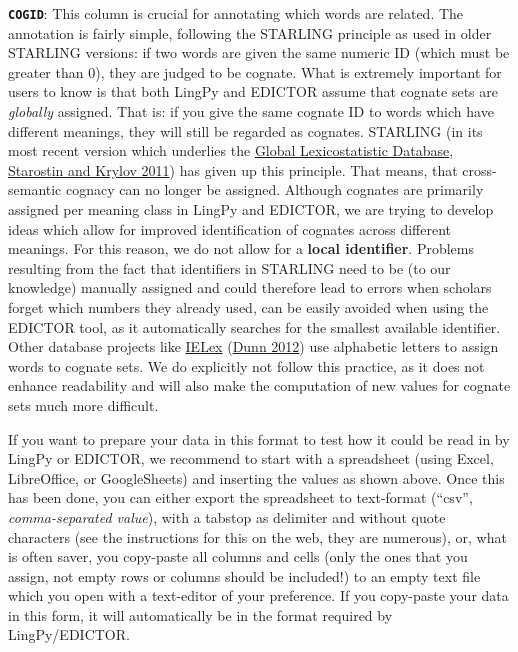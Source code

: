 \documentclass[a4paper,svgnames]{scrartcl}
\begin{document}
\begin{enumerate}
  \textbf{\texttt{COGID}}: This column is crucial for annotating which
  words are related. The annotation is fairly simple, following the
  STARLING principle as used in older STARLING versions: if two words
  are given the same numeric ID (which must be greater than 0), they are
  judged to be cognate. What is extremely important for users to know is
  that both LingPy and EDICTOR assume that cognate sets are
  \emph{globally} assigned. That is: if you give the same cognate ID to
  words which have different meanings, they will still be regarded as
  cognates. STARLING (in its most recent version which underlies the
  \href{http://starling.rinet.ru/new100/main.htm}{Global Lexicostatistic
  Database},
  \href{http://bibliography.lingpy.org?key=Starostin2011}{Starostin and
  Krylov 2011}) has given up this principle. That means, that
  cross-semantic cognacy can no longer be assigned. Although cognates
  are primarily assigned per meaning class in LingPy and EDICTOR, we are
  trying to develop ideas which allow for improved identification of
  cognates across different meanings. For this reason, we do not allow
  for a \textbf{local identifier}. Problems resulting from the fact that
  identifiers in STARLING need to be (to our knowledge) manually
  assigned and could therefore lead to errors when scholars forget which
  numbers they already used, can be easily avoided when using the
  EDICTOR tool, as it automatically searches for the smallest available
  identifier. Other database projects like
  \href{http://ielex.mpi.nl/}{IELex}
  (\href{http://bibliography.lingpy.org?key=Dunn2012}{Dunn 2012}) use
  alphabetic letters to assign words to cognate sets. We do explicitly
  not follow this practice, as it does not enhance readability and will
  also make the computation of new values for cognate sets much more
  difficult.
\end{enumerate}

If you want to prepare your data in this format to test how it could be
read in by LingPy or EDICTOR, we recommend to start with a spreadsheet
(using Excel, LibreOffice, or GoogleSheets) and inserting the values as
shown above. Once this has been done, you can either export the
spreadsheet to text-format (``csv'', \emph{comma-separated value}), with
a tabstop as delimiter and without quote characters (see the
instructions for this on the web, they are numerous), or, what is often
saver, you copy-paste all columns and cells (only the ones that you
assign, not empty rows or columns should be included!) to an empty text
file which you open with a text-editor of your preference. If you
copy-paste your data in this form, it will automatically be in the
format required by LingPy/EDICTOR.
\end{document}
